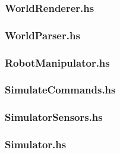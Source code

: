 \documentclass[12pt, titlepage]{article}
\begin{document}
\subsubsection{WorldRenderer.hs}
\label{subsec:interpreter}


\subsubsection{WorldParser.hs}
\label{subsec:interpreter}


\subsubsection{RobotManipulator.hs}
\label{subsec:interpreter}


\subsubsection{SimulateCommands.hs}
\label{subsec:interpreter}


\subsubsection{SimulatorSensors.hs}
\label{subsec:interpreter}


\subsubsection{Simulator.hs}
\label{subsec:interpreter}

\end{document}
